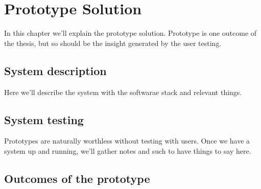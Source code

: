\chapter{Prototype Solution}
\label{chapter:prototype}

In this chapter we'll explain the prototype solution. Prototype is one outcome
of the thesis, but so should be the insight generated by the user testing.

\section{System description}
\label{sec:system_description}

Here we'll describe the system with the softwarae stack and relevant things.

\section{System testing}
\label{sec:system_testing}

Prototypes are naturally worthless without testing with users. Once we have a
system up and running, we'll gather notes and such to have things to say here.

\section{Outcomes of the prototype}
\label{sec:prototype_outcomes}

